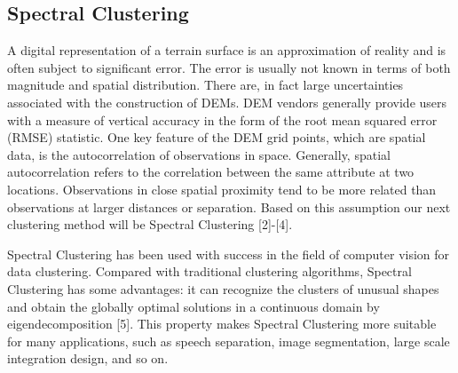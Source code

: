 \documentclass[12pt,letterpaper]{article}
\begin{document}
\subsection{Spectral Clustering}
A digital representation of a terrain surface is an approximation of
reality and is often subject to significant error. The error is
usually not known in terms of both magnitude and spatial distribution.
There are, in fact large uncertainties associated with the construction
of DEMs. DEM vendors generally provide users with a
measure of vertical accuracy in the form of the root mean squared
error (RMSE) statistic.
One key feature of the DEM grid points, which are spatial data, is the 
autocorrelation of observations in space.  Generally, spatial autocorrelation refers to the
correlation between the same attribute at two locations. Observations
in close spatial proximity tend to be more related than observations at larger distances or separation. Based on this
assumption our next clustering method will be Spectral Clustering [2]-[4]. %

Spectral Clustering has been used with success in the field of computer vision for data clustering. Compared with
traditional clustering algorithms, Spectral Clustering has some advantages: it can recognize the clusters of unusual
shapes and obtain the globally optimal solutions in a continuous domain by eigendecomposition [5]. This property makes
Spectral Clustering more suitable for many applications, such as speech separation, image segmentation, large scale integration design, and so on.
\end{document}
